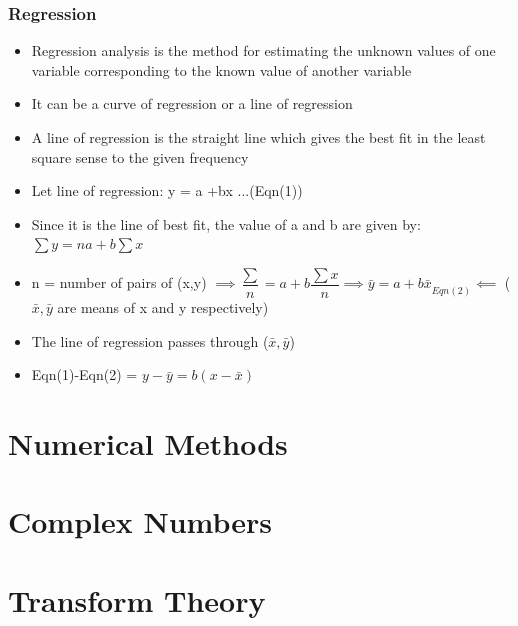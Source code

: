 \documentclass[8pt]{report}
\begin{document}
	\subsection{Regression}
		\begin{itemize}
			\item Regression analysis is the method for estimating the unknown values of one variable corresponding to the known value of another variable
			\item It can be a curve of regression or a line of regression
			\item A line of regression is the straight line which gives the best fit in the least square sense to the given frequency
			\item Let line of regression: y = a +bx ...(Eqn(1))
			\item Since it is the line of best fit, the value of a and b are given by: $\sum y = na +b\sum x$
			\item n = number of pairs of (x,y) $\implies \dfrac{\sum}{n} = a + b\dfrac{\sum x}{n}\implies \boxed{\bar{y} = a+b\bar{x}}_{Eqn(2)}\impliedby$ ($\bar{x},\bar{y}$ are means of x and y respectively)
			\item The line of regression passes through ($\bar{x},\bar{y}$)
			\item Eqn(1)-Eqn(2) = $y-\bar{y} = b(x-\bar{x})$  
		\end{itemize}\hrulefill
\chapter{Numerical Methods}
\chapter{Complex Numbers}
\chapter{Transform Theory}
\end{document}
